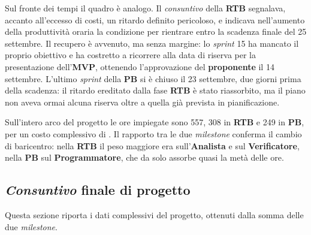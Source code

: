 \documentclass[12pt, a4paper]{article}
\begin{document}
{Sul fronte dei tempi il quadro è analogo. Il \textit{consuntivo} della \textbf{RTB} segnalava, accanto all'eccesso di costi, un ritardo definito pericoloso, e indicava nell'aumento della produttività oraria la condizione per rientrare entro la scadenza finale del 25 settembre. Il recupero è avvenuto, ma senza margine: lo \textit{sprint} 15 ha mancato il proprio obiettivo e ha costretto a ricorrere alla data di riserva per la presentazione dell'\textbf{MVP}, ottenendo l'approvazione del \textbf{proponente} il 14 settembre. L'ultimo \textit{sprint} della \textbf{PB} si è chiuso il 23 settembre, due giorni prima della scadenza: il ritardo ereditato dalla fase \textbf{RTB} è stato riassorbito, ma il piano non aveva ormai alcuna riserva oltre a quella già prevista in pianificazione.

Sull'intero arco del progetto le ore impiegate sono 557, 308 in \textbf{RTB} e 249 in \textbf{PB}, per un costo complessivo di . Il rapporto tra le due \textit{milestone} conferma il cambio di baricentro: nella \textbf{RTB} il peso maggiore era sull'\textbf{Analista} e sul \textbf{Verificatore}, nella \textbf{PB} sul \textbf{Programmatore}, che da solo assorbe quasi la metà delle ore.

\subsection{\textit{Consuntivo} finale di progetto}
Questa sezione riporta i dati complessivi del progetto, ottenuti dalla somma delle due \textit{milestone}.

}
\end{document}

